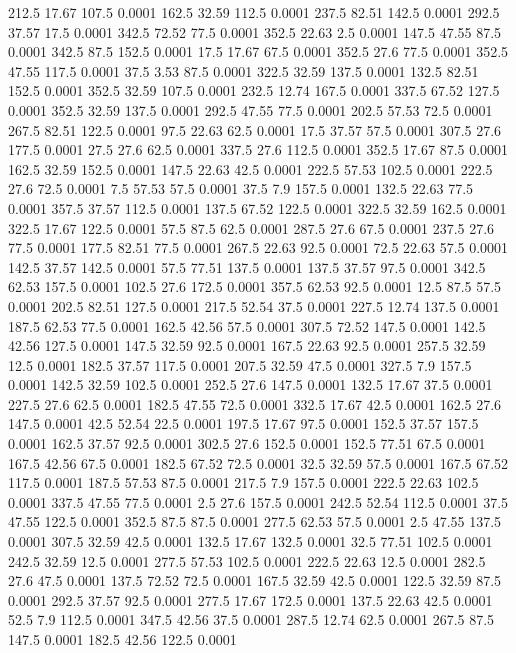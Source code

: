 212.5	17.67	107.5	0.0001
162.5	32.59	112.5	0.0001
237.5	82.51	142.5	0.0001
292.5	37.57	17.5	0.0001
342.5	72.52	77.5	0.0001
352.5	22.63	2.5	0.0001
147.5	47.55	87.5	0.0001
342.5	87.5	152.5	0.0001
17.5	17.67	67.5	0.0001
352.5	27.6	77.5	0.0001
352.5	47.55	117.5	0.0001
37.5	3.53	87.5	0.0001
322.5	32.59	137.5	0.0001
132.5	82.51	152.5	0.0001
352.5	32.59	107.5	0.0001
232.5	12.74	167.5	0.0001
337.5	67.52	127.5	0.0001
352.5	32.59	137.5	0.0001
292.5	47.55	77.5	0.0001
202.5	57.53	72.5	0.0001
267.5	82.51	122.5	0.0001
97.5	22.63	62.5	0.0001
17.5	37.57	57.5	0.0001
307.5	27.6	177.5	0.0001
27.5	27.6	62.5	0.0001
337.5	27.6	112.5	0.0001
352.5	17.67	87.5	0.0001
162.5	32.59	152.5	0.0001
147.5	22.63	42.5	0.0001
222.5	57.53	102.5	0.0001
222.5	27.6	72.5	0.0001
7.5	57.53	57.5	0.0001
37.5	7.9	157.5	0.0001
132.5	22.63	77.5	0.0001
357.5	37.57	112.5	0.0001
137.5	67.52	122.5	0.0001
322.5	32.59	162.5	0.0001
322.5	17.67	122.5	0.0001
57.5	87.5	62.5	0.0001
287.5	27.6	67.5	0.0001
237.5	27.6	77.5	0.0001
177.5	82.51	77.5	0.0001
267.5	22.63	92.5	0.0001
72.5	22.63	57.5	0.0001
142.5	37.57	142.5	0.0001
57.5	77.51	137.5	0.0001
137.5	37.57	97.5	0.0001
342.5	62.53	157.5	0.0001
102.5	27.6	172.5	0.0001
357.5	62.53	92.5	0.0001
12.5	87.5	57.5	0.0001
202.5	82.51	127.5	0.0001
217.5	52.54	37.5	0.0001
227.5	12.74	137.5	0.0001
187.5	62.53	77.5	0.0001
162.5	42.56	57.5	0.0001
307.5	72.52	147.5	0.0001
142.5	42.56	127.5	0.0001
147.5	32.59	92.5	0.0001
167.5	22.63	92.5	0.0001
257.5	32.59	12.5	0.0001
182.5	37.57	117.5	0.0001
207.5	32.59	47.5	0.0001
327.5	7.9	157.5	0.0001
142.5	32.59	102.5	0.0001
252.5	27.6	147.5	0.0001
132.5	17.67	37.5	0.0001
227.5	27.6	62.5	0.0001
182.5	47.55	72.5	0.0001
332.5	17.67	42.5	0.0001
162.5	27.6	147.5	0.0001
42.5	52.54	22.5	0.0001
197.5	17.67	97.5	0.0001
152.5	37.57	157.5	0.0001
162.5	37.57	92.5	0.0001
302.5	27.6	152.5	0.0001
152.5	77.51	67.5	0.0001
167.5	42.56	67.5	0.0001
182.5	67.52	72.5	0.0001
32.5	32.59	57.5	0.0001
167.5	67.52	117.5	0.0001
187.5	57.53	87.5	0.0001
217.5	7.9	157.5	0.0001
222.5	22.63	102.5	0.0001
337.5	47.55	77.5	0.0001
2.5	27.6	157.5	0.0001
242.5	52.54	112.5	0.0001
37.5	47.55	122.5	0.0001
352.5	87.5	87.5	0.0001
277.5	62.53	57.5	0.0001
2.5	47.55	137.5	0.0001
307.5	32.59	42.5	0.0001
132.5	17.67	132.5	0.0001
32.5	77.51	102.5	0.0001
242.5	32.59	12.5	0.0001
277.5	57.53	102.5	0.0001
222.5	22.63	12.5	0.0001
282.5	27.6	47.5	0.0001
137.5	72.52	72.5	0.0001
167.5	32.59	42.5	0.0001
122.5	32.59	87.5	0.0001
292.5	37.57	92.5	0.0001
277.5	17.67	172.5	0.0001
137.5	22.63	42.5	0.0001
52.5	7.9	112.5	0.0001
347.5	42.56	37.5	0.0001
287.5	12.74	62.5	0.0001
267.5	87.5	147.5	0.0001
182.5	42.56	122.5	0.0001
